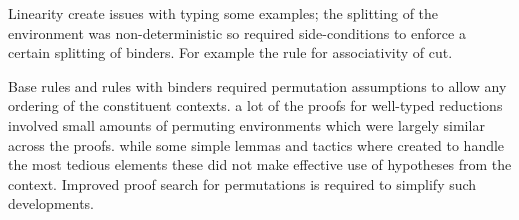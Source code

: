 Linearity create issues with typing some examples; the splitting of the
environment was non-deterministic so required side-conditions to enforce a
certain splitting of binders. For example the rule for associativity of
cut. 

Base rules and rules with binders required permutation assumptions to allow
any ordering of the constituent contexts. a lot of the proofs for well-typed
reductions involved small amounts of permuting environments which were largely
similar across the proofs. while some simple lemmas and tactics where created
to handle the most tedious elements these did not make effective use of
hypotheses from the context. Improved proof search for permutations is
required to simplify such developments.

